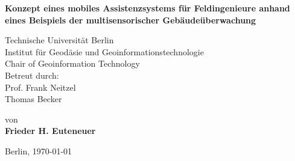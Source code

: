 \begin{center}
\vspace*{\fill}

    {\Large{\bf Konzept eines mobiles Assistenzsystems für Feldingenieure anhand eines Beispiels der multisensorischer Gebäudeüberwachung}} \vspace{0.5cm}


    {\normalsize Technische Universität Berlin\\
    Institut für Geodäsie und Geoinformationstechnologie\\
	Chair of Geoinformation Technology\\
	Betreut durch:\\	
	Prof. Frank Neitzel\\
	Thomas Becker}\vspace{1cm}

    {\normalsize von \\\vspace{0.5cm}
    {\bf Frieder H. Euteneuer}} \vspace{1cm}
		

    {\normalsize Berlin, \today}
\vfill
\end{center}

